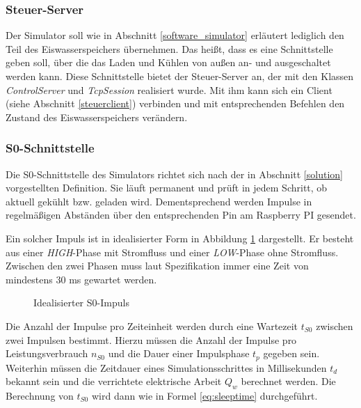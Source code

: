 \subsubsection{Steuer-Server}
Der Simulator soll wie in Abschnitt \ref{software_simulator} erläutert lediglich den Teil des Eiswasserspeichers übernehmen. Das heißt, dass es eine Schnittstelle geben soll, über die das Laden und Kühlen von außen an- und ausgeschaltet werden kann. Diese Schnittstelle bietet der Steuer-Server an, der mit den Klassen \emph{ControlServer} und \emph{TcpSession} realisiert wurde. Mit ihm kann sich ein Client (siehe Abschnitt \ref{steuerclient}) verbinden und mit entsprechenden Befehlen den Zustand des Eiswasserspeichers verändern.

\subsubsection{S0-Schnittstelle}
Die S0-Schnittstelle des Simulators richtet sich nach der in Abschnitt \ref{solution} vorgestellten Definition. Sie läuft permanent und prüft in jedem Schritt, ob aktuell gekühlt bzw. geladen wird. Dementsprechend werden Impulse in regelmäßigen Abständen über den entsprechenden Pin am Raspberry PI gesendet.

Ein solcher Impuls ist in idealisierter Form in Abbildung \ref{fig:s0impuls} dargestellt. Er besteht aus einer \emph{HIGH}-Phase mit Stromfluss und einer \emph{LOW}-Phase ohne Stromfluss. Zwischen den zwei Phasen muss laut Spezifikation immer eine Zeit von mindestens 30 ms gewartet werden.

\begin{figure}[h]
\begin{center}
\label{fig:s0impuls}
\caption{Idealisierter S0-Impuls}
\end{center}
\end{figure}

Die Anzahl der Impulse pro Zeiteinheit werden durch eine Wartezeit $ t_{S0} $ zwischen zwei Impulsen bestimmt. Hierzu müssen die Anzahl der Impulse pro Leistungsverbrauch $ n_{S0} $ und die Dauer einer Impulsphase $ t_p $ gegeben sein. Weiterhin müssen die Zeitdauer eines Simulationsschrittes in Millisekunden $ t_d $ bekannt sein und die verrichtete elektrische Arbeit $ Q_w $ berechnet werden. Die Berechnung von $ t_{S0} $ wird dann wie in Formel \ref{eq:sleeptime} durchgeführt.

